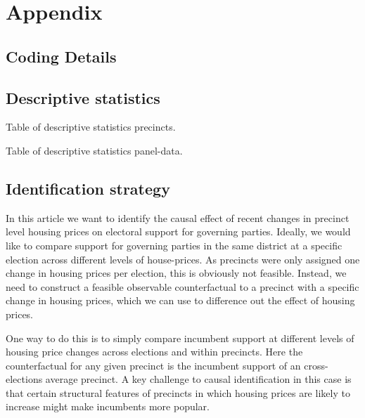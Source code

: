 \documentclass[12pt,a4paper]{article}
\begin{document}
	
	
	
	
	
	
	
	
	
	
	
	\clearpage
	
	\singlespacing
	
	
	
	
	\newpage
	
	\appendix
	\section*{Appendix}
	\renewcommand{\thesubsection}{\Alph{subsection}}
	\renewcommand{\thetable}{\Alph{subsection}\arabic{table}}
	
	\localtableofcontents
	
	
\subsection{Coding Details}
	
	\subsection{Descriptive statistics}
	\setcounter{table}{0}
	
	Table of descriptive statistics precincts.
	
	
	
	Table of descriptive statistics panel-data.
	
	\newpage
	
	\subsection{Identification strategy}
	
	In this article we want to identify the causal effect of recent changes in precinct level housing prices on electoral support for governing parties. Ideally, we would like to compare support for governing parties in the same district at a specific election across different levels of house-prices. As precincts were only assigned one change in housing prices per election, this is obviously not feasible. Instead, we need to construct a feasible observable counterfactual to a precinct with a specific change in housing prices, which we can use to difference out the effect of housing prices.
	
	One way to do this is to simply compare incumbent support at different levels of housing price changes across elections and within precincts. Here the counterfactual for any given precinct is the incumbent support of an cross-elections average precinct. A key challenge to causal identification in this case is that certain structural features of precincts in which housing prices are likely to increase might make incumbents more popular.
	
\end{document}
